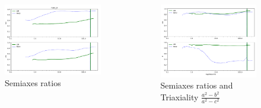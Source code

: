\documentclass[xcolor=dvipsnames]{beamer}
\begin{document}
\begin{frame}[plain]

\begin{columns}[c]

\begin{column}{.5\textwidth}
\begin{figure}
\includegraphics[width=1.1\columnwidth]{./pics/parte1.png}
\caption{\tiny Semiaxes ratios}
\end{figure}
\end{column}

\begin{column}{.5\textwidth}
\centering
\begin{figure}
\includegraphics[width=1.1\columnwidth]{./pics/parte2.png}
\caption{\tiny Semiaxes ratios and Triaxiality $\frac{a^2-b^2}{a^2-c^2}$}
\end{figure}

\end{column}

\end{columns}


\end{frame}
\end{document}

